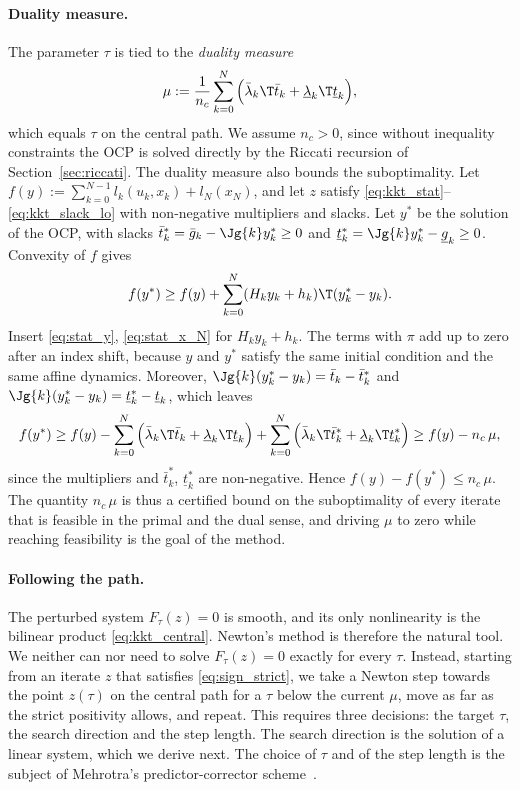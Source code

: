 \paragraph{Duality measure.}
The parameter $\tau$ is tied to the \textit{duality measure}~\cite{wright1997primal}
\[
    \mu := \frac{1}{n_c}\sum_{k=0}^{N} \Big( \bar{\lambda}_k\T \bar{t}_k + \underline{\lambda}_k\T \underline{t}_k \Big) ,
\]
which equals $\tau$ on the central path.
We assume $n_c > 0$, since without inequality constraints the OCP is solved directly by the Riccati recursion of Section~\ref{sec:riccati}.
The duality measure also bounds the suboptimality.
Let $f(y) := \sum_{k=0}^{N-1} l_k(u_k, x_k) + l_N(x_N)$, and let $z$ satisfy \eqref{eq:kkt_stat}--\eqref{eq:kkt_slack_lo} with non-negative multipliers and slacks.
Let $y^*$ be the solution of the OCP, with slacks $\bar{t}_k^* = \bar{g}_k - \Jg{k} y_k^* \geq 0$ and $\underline{t}_k^* = \Jg{k} y_k^* - \underline{g}_k \geq 0$.
Convexity of $f$ gives
\[
    f(y^*) \geq f(y) + \sum_{k=0}^{N} (H_k y_k + h_k)\T (y_k^* - y_k) .
\]
Insert \eqref{eq:stat_y}, \eqref{eq:stat_x_N} for $H_k y_k + h_k$.
The terms with $\pi$ add up to zero after an index shift, because $y$ and $y^*$ satisfy the same initial condition and the same affine dynamics.
Moreover, $\Jg{k}(y_k^* - y_k) = \bar{t}_k - \bar{t}_k^*$ and $\Jg{k}(y_k^* - y_k) = \underline{t}_k^* - \underline{t}_k$, which leaves
\[
    f(y^*) \geq f(y) - \sum_{k=0}^{N}\Big( \bar{\lambda}_k\T \bar{t}_k + \underline{\lambda}_k\T \underline{t}_k \Big)
        + \sum_{k=0}^{N}\Big( \bar{\lambda}_k\T \bar{t}_k^* + \underline{\lambda}_k\T \underline{t}_k^* \Big)
    \geq f(y) - n_c\, \mu ,
\]
since the multipliers and $\bar{t}_k^*$, $\underline{t}_k^*$ are non-negative.
Hence $f(y) - f(y^*) \leq n_c\, \mu$.
The quantity $n_c\, \mu$ is thus a certified bound on the suboptimality of every iterate that is feasible in the primal and the dual sense, and driving $\mu$ to zero while reaching feasibility is the goal of the method.

\paragraph{Following the path.}
The perturbed system $F_\tau(z) = 0$ is smooth, and its only nonlinearity is the bilinear product \eqref{eq:kkt_central}.
Newton's method is therefore the natural tool.
We neither can nor need to solve $F_\tau(z) = 0$ exactly for every $\tau$.
Instead, starting from an iterate $z$ that satisfies \eqref{eq:sign_strict}, we take a Newton step towards the point $z(\tau)$ on the central path for a $\tau$ below the current $\mu$, move as far as the strict positivity allows, and repeat.
This requires three decisions: the target $\tau$, the search direction and the step length.
The search direction is the solution of a linear system, which we derive next.
The choice of $\tau$ and of the step length is the subject of Mehrotra's predictor-corrector scheme~\cite{mehrotra1992implementation}.


